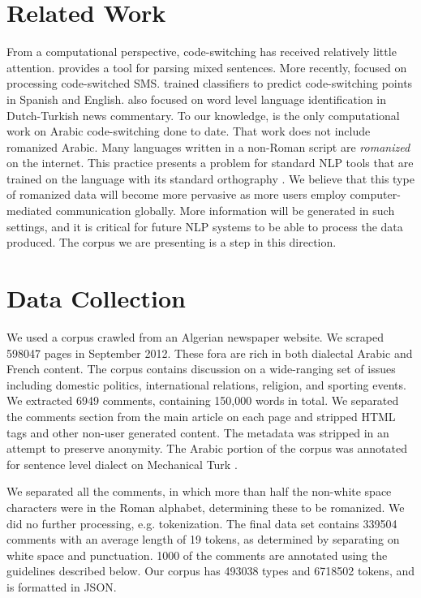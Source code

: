 \documentclass[10pt, a4paper]{article}
\begin{document}
\section{Related Work}
From a computational perspective, code-switching has received
relatively little attention.  provides
a tool for parsing mixed sentences. More recently,
 focused on processing code-switched
SMS.  trained classifiers to predict
code-switching points in Spanish and English. 
also focused on word level language identification in Dutch-Turkish
news commentary. To our knowledge,  is the
only computational work on Arabic code-switching done to date. That
work does not include romanized Arabic. Many languages written in a
non-Roman script are \emph{romanized} on the internet. This practice
presents a problem for standard NLP tools that are trained on the
language with its standard orthography \cite{irvine2012processing}. We
believe that this type of romanized data will become more pervasive as
more users employ computer-mediated communication globally. More information
will be generated in such settings, and it is critical for future NLP
systems to be able to process the data produced. The corpus we are
presenting is a step in this direction.

\section{Data Collection}
We used a corpus crawled from an Algerian newspaper
website. We scraped 598047 pages in September 2012. These fora are
rich in both dialectal Arabic and French content. The
corpus contains discussion on a wide-ranging set of issues including
domestic politics, international relations, religion, and sporting
events.  We extracted 6949 comments, containing 150,000 words in
total. We separated the comments section from the main article on each
page and stripped HTML tags and other non-user generated content. The
metadata was stripped in an attempt to preserve anonymity.  The Arabic
portion of the corpus was annotated for sentence level dialect on
Mechanical Turk \cite{cotterell2014extended}.

We separated all the comments, in which more than half the non-white
space characters were in the Roman alphabet, determining these to be
romanized.  We did no further processing, e.g. tokenization.  The
final data set contains 339504 comments with an average
length of 19 tokens, as determined by separating on white space and
punctuation. 1000 of the comments are annotated using
the guidelines described below. Our corpus has 493038 types and 6718502 tokens, and is
formatted in JSON.
\end{document}
